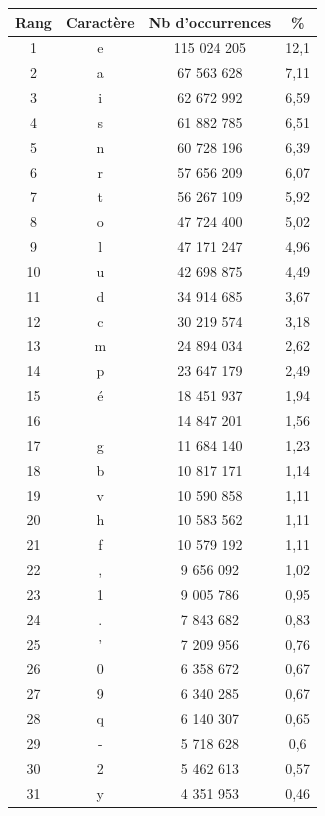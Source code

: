 \documentclass[a4paper,12pt,titlepage]{report}
\begin{document}
\begin{table}[h!]
\begin{tabular}{|c|c|c|c|}
\hline
\textbf{Rang} & \textbf{Caractère} & \textbf{Nb d'occurrences} & \textbf{\%} \\
\hline
1 &	e &	115 024 205 & 12,1 \\
\hline
2 &	a &	67 563 628 & 7,11 \\
\hline
3 &	i &	62 672 992 & 6,59 \\
\hline
4 &	s &	61 882 785 & 6,51 \\
\hline
5 &	n &	60 728 196 & 6,39 \\
\hline
6 &	r &	57 656 209 & 6,07 \\
\hline
7 &	t &	56 267 109 & 5,92 \\
\hline
8 &	o &	47 724 400 & 5,02 \\
\hline
9 &	l &	47 171 247 & 4,96 \\
\hline
10 & u & 42 698 875 & 4,49 \\
\hline
11 & d & 34 914 685 & 3,67 \\
\hline
12 & c & 30 219 574 & 3,18 \\
\hline
13 & m & 24 894 034 & 2,62 \\
\hline
14 & p & 23 647 179 & 2,49 \\
\hline
15 & é & 18 451 937 & 1,94 \\
\hline
16 &   & 14 847 201 & 1,56 \\
\hline
17 & g & 11 684 140 & 1,23 \\
\hline
18 & b & 10 817 171 & 1,14 \\
\hline
19 & v & 10 590 858 & 1,11 \\ 
\hline
20 & h & 10 583 562 & 1,11 \\ 
\hline
21 & f & 10 579 192 & 1,11 \\
\hline
22 & , &  9 656 092 & 1,02 \\
\hline
23 & 1 &  9 005 786 & 0,95 \\
\hline
24 & . &  7 843 682 & 0,83 \\
\hline
25 & ' &  7 209 956 & 0,76 \\
\hline
26 & 0 &  6 358 672 & 0,67 \\
\hline
27 & 9 &  6 340 285 & 0,67 \\
\hline
28 & q &  6 140 307 & 0,65 \\
\hline
29 & - &  5 718 628 & 0,6  \\
\hline
30 & 2 &  5 462 613 & 0,57 \\
\hline
31 & y &  4 351 953 & 0,46 \\

\end{tabular}
\end{table}
\end{document}

